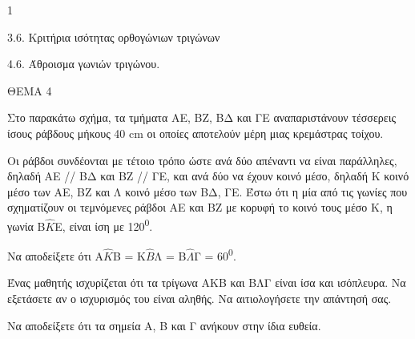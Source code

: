 \begin{ylh}{1}
    \item 3.6. Κριτήρια ισότητας ορθογώνιων τριγώνων
    \item 4.6. Άθροισμα γωνιών τριγώνου.
\end{ylh}

ΘΕΜΑ 4

Στο παρακάτω σχήμα, τα τμήματα ΑΕ, ΒΖ, ΒΔ και ΓΕ αναπαριστάνουν τέσσερεις ίσους ράβδους μήκους 40 cm οι οποίες αποτελούν μέρη μιας κρεμάστρας τοίχου.

Οι ράβδοι συνδέονται με τέτοιο τρόπο ώστε ανά δύο απέναντι να είναι παράλληλες, δηλαδή ΑΕ // ΒΔ και ΒΖ // ΓΕ, και ανά δύο να έχουν κοινό μέσο, δηλαδή Κ κοινό μέσο των ΑΕ, ΒΖ και Λ κοινό μέσο των ΒΔ, ΓΕ. Έστω ότι η μία από τις γωνίες που σχηματίζουν οι τεμνόμενες ράβδοι ΑΕ και ΒΖ με κορυφή το κοινό τους μέσο Κ, η γωνία Β$\widehat{Κ}$Ε, είναι ίση με 120\textsuperscript{0}.

\begin{alist}
\item Να αποδείξετε ότι Α$\widehat{Κ}$Β = Κ$\widehat{Β}$Λ = Β$\widehat{\Lambda}$Γ = 60\textsuperscript{0}. 

\item Ένας μαθητής ισχυρίζεται ότι τα τρίγωνα ΑΚΒ και ΒΛΓ είναι ίσα και ισόπλευρα. Να εξετάσετε αν ο ισχυρισμός του είναι αληθής. Να αιτιολογήσετε την απάντησή σας.


\item Να αποδείξετε ότι τα σημεία Α, Β και Γ ανήκουν στην ίδια ευθεία. 


\begin{center}
\end{center}
\end{alist}
